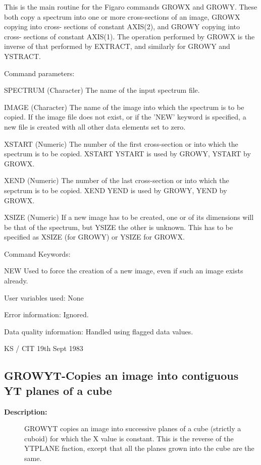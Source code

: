 \begin{description}
\begin{description}
\begin{terminalv}
 This is the main routine for the Figaro commands GROWX
 and GROWY.  These both copy a spectrum into one or more
 cross-sections of an image, GROWX copying into cross-
 sections of constant AXIS(2), and GROWY copying into cross-
 sections of constant AXIS(1).  The operation performed by GROWX
 is the inverse of that performed by EXTRACT, and similarly
 for GROWY and YSTRACT.

 Command parameters:

 SPECTRUM    (Character) The name of the input spectrum file.

 IMAGE       (Character) The name of the image into which the
             spectrum is to be copied.  If the image file does
             not exist, or if the 'NEW' keyword is specified,
             a new file is created with all other data elements
             set to zero.

 XSTART      (Numeric) The number of the first cross-section
   or        into which the spectrum is to be copied.  XSTART
 YSTART      is used by GROWY, YSTART by GROWX.

 XEND        (Numeric) The number of the last cross-section
   or        into which the sepctrum is to be copied.  XEND
 YEND        is used by GROWY, YEND by GROWX.

 XSIZE       (Numeric) If a new image has to be created, one
   or        of its dimensions will be that of the spectrum, but
 YSIZE       the other is unknown.  This has to be specified as
             XSIZE (for GROWY) or YSIZE for GROWX.

 Command Keywords:

 NEW         Used to force the creation of a new image, even if
             such an image exists already.

 User variables used:  None

 Error information:  Ignored.

 Data quality information: Handled using flagged data values.

                                         KS / CIT 19th Sept 1983
\end{terminalv}
\end{description}
\subsection{GROWYT-\label{GROWYT}Copies an image into contiguous YT planes of a cube}
\begin{description}

\item [\textbf{Description:}]
 GROWYT copies an image into successive planes of a cube (strictly
 a cuboid) for which the X value is constant.  This is the reverse
 of the YTPLANE fnction, except that all the planes grown into the
 cube are the same.


\end{description}
\end{description}
